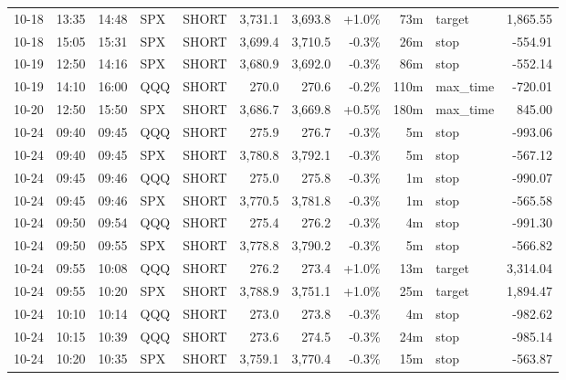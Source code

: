 \documentclass[11pt,a4paper,twoside]{article}
\begin{document}
\begin{center}
\begin{longtable}{>{\color{txtmain}}l l l l l r r r r >{\color{txtmain}}l r}
10-18 & 13:35 & 14:48 & SPX & SHORT & 3,731.1 & 3,693.8 & \textcolor{wingreen}{+1.0\%} & 73m & target & \textcolor{wingreen}{1,865.55} \\
10-18 & 15:05 & 15:31 & SPX & SHORT & 3,699.4 & 3,710.5 & \textcolor{lossred}{-0.3\%} & 26m & stop & \textcolor{lossred}{-554.91} \\
10-19 & 12:50 & 14:16 & SPX & SHORT & 3,680.9 & 3,692.0 & \textcolor{lossred}{-0.3\%} & 86m & stop & \textcolor{lossred}{-552.14} \\
10-19 & 14:10 & 16:00 & QQQ & SHORT & 270.0 & 270.6 & \textcolor{lossred}{-0.2\%} & 110m & max\_time & \textcolor{lossred}{-720.01} \\
10-20 & 12:50 & 15:50 & SPX & SHORT & 3,686.7 & 3,669.8 & \textcolor{wingreen}{+0.5\%} & 180m & max\_time & \textcolor{wingreen}{845.00} \\
10-24 & 09:40 & 09:45 & QQQ & SHORT & 275.9 & 276.7 & \textcolor{lossred}{-0.3\%} & 5m & stop & \textcolor{lossred}{-993.06} \\
10-24 & 09:40 & 09:45 & SPX & SHORT & 3,780.8 & 3,792.1 & \textcolor{lossred}{-0.3\%} & 5m & stop & \textcolor{lossred}{-567.12} \\
10-24 & 09:45 & 09:46 & QQQ & SHORT & 275.0 & 275.8 & \textcolor{lossred}{-0.3\%} & 1m & stop & \textcolor{lossred}{-990.07} \\
10-24 & 09:45 & 09:46 & SPX & SHORT & 3,770.5 & 3,781.8 & \textcolor{lossred}{-0.3\%} & 1m & stop & \textcolor{lossred}{-565.58} \\
10-24 & 09:50 & 09:54 & QQQ & SHORT & 275.4 & 276.2 & \textcolor{lossred}{-0.3\%} & 4m & stop & \textcolor{lossred}{-991.30} \\
10-24 & 09:50 & 09:55 & SPX & SHORT & 3,778.8 & 3,790.2 & \textcolor{lossred}{-0.3\%} & 5m & stop & \textcolor{lossred}{-566.82} \\
10-24 & 09:55 & 10:08 & QQQ & SHORT & 276.2 & 273.4 & \textcolor{wingreen}{+1.0\%} & 13m & target & \textcolor{wingreen}{3,314.04} \\
10-24 & 09:55 & 10:20 & SPX & SHORT & 3,788.9 & 3,751.1 & \textcolor{wingreen}{+1.0\%} & 25m & target & \textcolor{wingreen}{1,894.47} \\
10-24 & 10:10 & 10:14 & QQQ & SHORT & 273.0 & 273.8 & \textcolor{lossred}{-0.3\%} & 4m & stop & \textcolor{lossred}{-982.62} \\
10-24 & 10:15 & 10:39 & QQQ & SHORT & 273.6 & 274.5 & \textcolor{lossred}{-0.3\%} & 24m & stop & \textcolor{lossred}{-985.14} \\
10-24 & 10:20 & 10:35 & SPX & SHORT & 3,759.1 & 3,770.4 & \textcolor{lossred}{-0.3\%} & 15m & stop & \textcolor{lossred}{-563.87} \\

\end{longtable}
\end{center}
\end{document}
